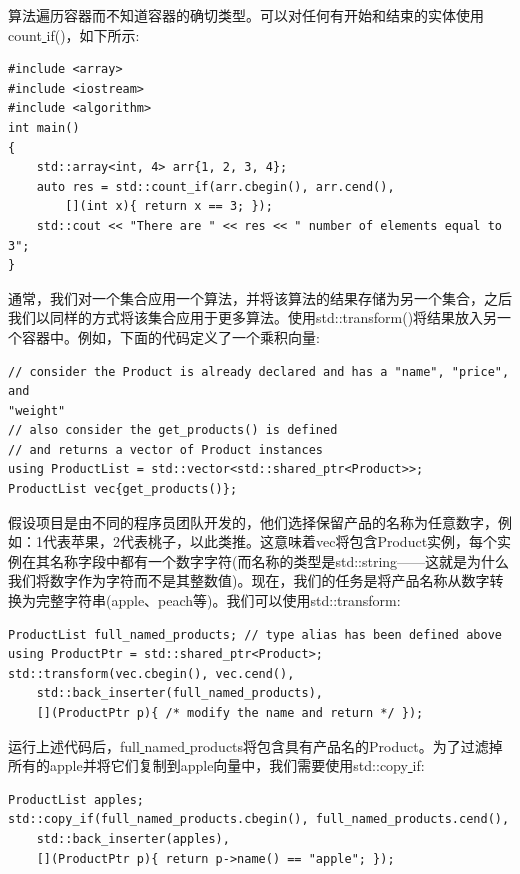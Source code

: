 算法遍历容器而不知道容器的确切类型。可以对任何有开始和结束的实体使用count\underline{ }if()，如下所示: \par

\begin{lstlisting}[caption={}]
#include <array>
#include <iostream>
#include <algorithm>
int main()
{
	std::array<int, 4> arr{1, 2, 3, 4};
	auto res = std::count_if(arr.cbegin(), arr.cend(),
		[](int x){ return x == 3; });
	std::cout << "There are " << res << " number of elements equal to 3";
}
\end{lstlisting}

通常，我们对一个集合应用一个算法，并将该算法的结果存储为另一个集合，之后我们以同样的方式将该集合应用于更多算法。使用std::transform()将结果放入另一个容器中。例如，下面的代码定义了一个乘积向量: \par

\begin{lstlisting}[caption={}]
// consider the Product is already declared and has a "name", "price", and
"weight"
// also consider the get_products() is defined
// and returns a vector of Product instances
using ProductList = std::vector<std::shared_ptr<Product>>;
ProductList vec{get_products()};
\end{lstlisting}

假设项目是由不同的程序员团队开发的，他们选择保留产品的名称为任意数字，例如：1代表苹果，2代表桃子，以此类推。这意味着vec将包含Product实例，每个实例在其名称字段中都有一个数字字符(而名称的类型是std::string——这就是为什么我们将数字作为字符而不是其整数值)。现在，我们的任务是将产品名称从数字转换为完整字符串(apple、peach等)。我们可以使用std::transform: \par

\begin{lstlisting}[caption={}]
ProductList full_named_products; // type alias has been defined above
using ProductPtr = std::shared_ptr<Product>;
std::transform(vec.cbegin(), vec.cend(),
	std::back_inserter(full_named_products),
	[](ProductPtr p){ /* modify the name and return */ });
\end{lstlisting}

运行上述代码后，full\underline{ }named\underline{ }products将包含具有产品名的Product。为了过滤掉所有的apple并将它们复制到apple向量中，我们需要使用std::copy\underline{ }if: \par

\begin{lstlisting}[caption={}]
ProductList apples;
std::copy_if(full_named_products.cbegin(), full_named_products.cend(),
	std::back_inserter(apples),
	[](ProductPtr p){ return p->name() == "apple"; });
\end{lstlisting}

